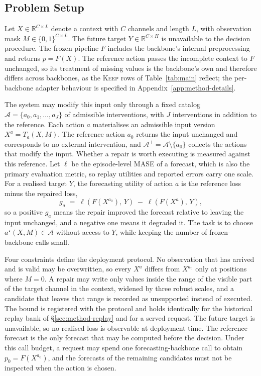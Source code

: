 \documentclass{article}
\newcommand{\calA}{\mathcal{A}}
\newcommand{\loss}{\ell}
\begin{document}
\subsection{Problem Setup}
\label{sec:method-problem}
Let $X \in \mathbb{R}^{C \times L}$ denote a context with $C$ channels and length $L$,
with observation mask $M \in \{0,1\}^{C \times L}$. The future target
$Y \in \mathbb{R}^{C \times H}$ is unavailable to the decision procedure. The frozen pipeline
$F$ includes the backbone's internal preprocessing and returns $p=F(X)$. The reference action
passes the incomplete context to $F$ unchanged, so its treatment of missing values is the
backbone's own and therefore differs across backbones, as the \textsc{Keep} rows of
Table~\ref{tab:main} reflect;
the per-backbone adapter behaviour is specified in Appendix~\ref{app:method-details}.

The system may modify this input only through a fixed catalog
$\calA = \{a_0, a_1, \dots, a_J\}$ of admissible interventions, with
$J$ interventions in addition to the reference. Each action $a$ materialises an admissible
input version $X^{a} = T_a(X, M)$. The reference action $a_0$ returns the input unchanged and
corresponds to no external intervention, and $\calA^{+} = \calA \setminus \{a_0\}$ collects
the actions that modify the input. Whether a repair is worth executing is measured against
this reference. Let $\loss$ be the episode-level MASE of a forecast, which is also the primary evaluation
metric, so replay utilities and reported errors carry one scale. For a realised target
$Y$, the forecasting utility of action $a$ is the reference loss minus the repaired loss,
\begin{equation}
  g_a \;=\; \loss\!\left(F(X^{a_0}),\, Y\right) \;-\; \loss\!\left(F(X^{a}),\, Y\right),
  \label{eq:utility}
\end{equation}
so a positive $g_a$ means the repair improved the forecast relative to leaving the input
unchanged, and a negative one means it degraded it. The task is to choose
$a^\star(X, M) \in \calA$ without access to $Y$, while keeping the
number of frozen-backbone calls small.

Four constraints define the deployment protocol. No observation that has arrived and is valid
may be overwritten, so every $X^{a}$ differs from $X^{a_0}$ only at positions where $M = 0$.
A repair may write only values inside the range of the visible part of the target channel in
the context, widened by three robust
scales, and a candidate that leaves that range is recorded as unsupported instead of executed.
The bound is registered with the protocol and holds identically for the historical replay bank
of \S\ref{sec:method-replay} and for a served
request. The future target is unavailable, so no realised loss is
observable at deployment time. The reference forecast is the only forecast that may be computed
before the decision. Under this call budget, a
request may spend one forecasting-backbone call to obtain $p_0 = F(X^{a_0})$, and the forecasts
of the remaining candidates must not be inspected when the action is chosen.
\end{document}
